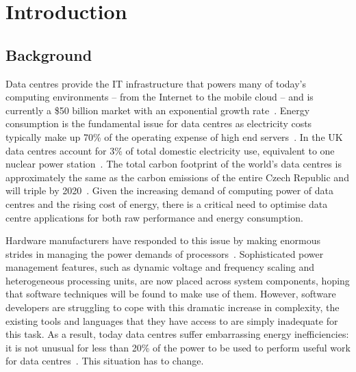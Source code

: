 \section{Introduction}\label{ch:overview}
\subsection{Background}
Data centres provide the IT infrastructure that powers many of today's computing environments -- from the Internet to the mobile cloud – and is currently a \$50 billion market with an exponential growth rate~\cite{bigdatacentre}. Energy consumption is the fundamental issue for data centres as electricity costs typically make up 70\% of the operating expense of high end servers~\cite{seventy,EPAreport,Energygov}. In the UK data centres account for 3\% of total domestic electricity use, equivalent to one nuclear power station~\cite{globalactionplan}. The total carbon footprint of the world's data centres is approximately the same as the carbon emissions of the entire Czech Republic and will triple by 2020~\cite{GeSI}. Given the increasing demand of computing power of data centres and the rising cost of energy, there is a critical need to optimise data centre applications for both raw performance and energy consumption.

Hardware manufacturers have responded to this issue by making enormous strides in managing the power demands of processors~\cite{chanandopp}. Sophisticated power management features, such as dynamic voltage and frequency scaling and heterogeneous processing units, are now placed across system components, hoping that software techniques will be found to make use of them. However, software developers are struggling to cope with this dramatic increase in complexity, the existing tools and languages that they have access to are simply inadequate for this task. As a result, today data centres suffer embarrassing energy inefficiencies: it is not unusual for less than 20\% of the power to be used to perform useful work for data centres~\cite{thecaseforepc}. This situation has to change.

